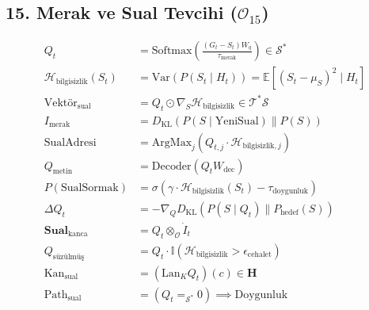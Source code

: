 \documentclass[11pt, a4paper]{article}
\begin{document}
\subsection{15. Merak ve Sual Tevcihi ($\mathcal{O}_{15}$)}
\begin{align}
Q_t &= \text{Softmax}\left( \frac{(G_t - S_t) W_q}{\tau_{\text{merak}}} \right) \in \mathcal{S}^* \\
\mathcal{H}_{\text{bilgisizlik}}(S_t) &= \text{Var}(P(S_t \mid H_t)) = \mathbb{E}[(S_t - \mu_S)^2 \mid H_t] \\
\text{Vektör}_{\text{sual}} &= Q_t \odot \nabla_{S} \mathcal{H}_{\text{bilgisizlik}} \in \mathcal{T}^*\mathcal{S} \\
I_{\text{merak}} &= D_{\text{KL}}\left( P(S \mid \text{YeniSual}) \parallel P(S) \right) \\
\text{SualAdresi} &= \text{ArgMax}_{j} (Q_{t, j} \cdot \mathcal{H}_{\text{bilgisizlik}, j}) \\
Q_{\text{metin}} &= \text{Decoder}(Q_t W_{\text{dec}}) \\
P(\text{SualSormak}) &= \sigma(\gamma \cdot \mathcal{H}_{\text{bilgisizlik}}(S_t) - \tau_{\text{doygunluk}}) \\
\Delta Q_t &= -\nabla_Q D_{\text{KL}}(P(S \mid Q_t) \parallel P_{\text{hedef}}(S)) \\
\mathbf{Sual}_{\text{kanca}} &= Q_t \otimes_{\mathcal{O}} \dot{I}_t \\
Q_{\text{süzülmüş}} &= Q_t \cdot \mathbb{I}(\mathcal{H}_{\text{bilgisizlik}} > \epsilon_{\text{cehalet}}) \\
\text{Kan}_{\text{sual}} &= (\text{Lan}_K Q_t)(c) \in \mathbf{H} \\
\text{Path}_{\text{sual}} &= (Q_t =_{\mathcal{S}^*} 0) \implies \text{Doygunluk}
\end{align}
\end{document}
